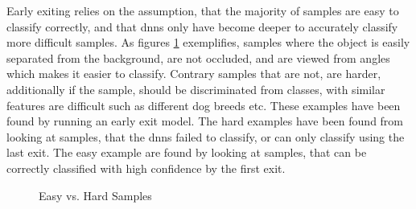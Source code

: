 Early exiting relies on the assumption, that the majority of samples are easy to classify correctly, and that \gls{dnn}s only have become deeper to accurately classify more difficult samples. As figures \ref{fig:hardvseasydog} exemplifies, samples where the object is easily separated from the background, are not occluded, and are viewed from angles which makes it easier to classify. Contrary samples that are not, are harder, additionally if the sample, should be discriminated from classes, with similar features are difficult such as different dog breeds etc. These examples have been found by running an early exit model. The hard examples have been found from looking at samples, that the \gls{dnn}s failed to classify, or can only classify using the last exit. The easy example are found by looking at samples, that can be correctly classified with high confidence by the first exit. 

\begin{figure}
	\captionsetup[subfigure]{justification=centering}
	\centering
	\caption[Easy vs. Hard Samples]{Easy vs. Hard Samples}
	\label{fig:hardvseasydog}
\end{figure}

